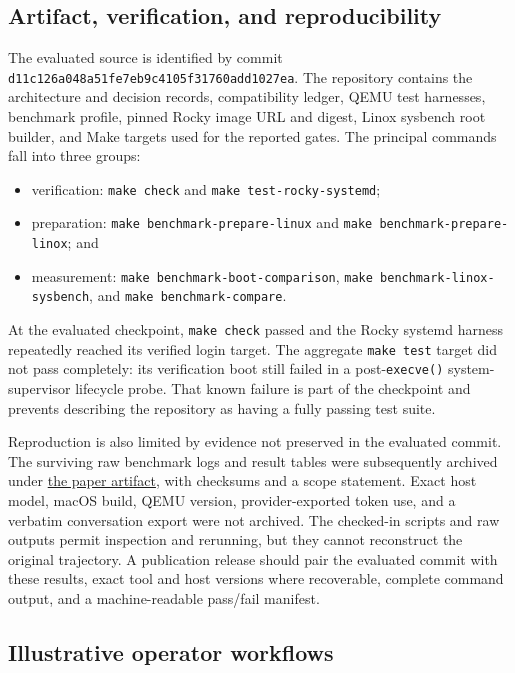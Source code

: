 \documentclass[11pt]{article}
\newcommand{\evaluatedcommit}{\texttt{d11c126a048a\allowbreak{}51fe7eb9c410\allowbreak{}5f31760add10\allowbreak{}27ea}}
\begin{document}
\subsection{Artifact, verification, and reproducibility}

The evaluated source is identified by commit \evaluatedcommit{}. The repository
contains the architecture and decision records, compatibility ledger, QEMU test
harnesses, benchmark profile, pinned Rocky image URL and digest, Linox sysbench
root builder, and Make targets used for the reported gates. The principal
commands fall into three groups:

\begin{itemize}[leftmargin=*,topsep=0.3em,itemsep=0.15em,parsep=0pt]
\item verification: \texttt{make check} and \texttt{make test-rocky-systemd};
\item preparation: \texttt{make benchmark-prepare-linux} and
  \texttt{make benchmark-prepare-linox}; and
\item measurement: \texttt{make benchmark-boot-comparison},
  \texttt{make benchmark-linox-sysbench}, and \texttt{make benchmark-compare}.
\end{itemize}

At the evaluated checkpoint, \texttt{make check} passed and the Rocky systemd
harness repeatedly reached its verified login target. The aggregate
\texttt{make test} target did not pass completely: its verification boot still
failed in a post-\texttt{execve()} system-supervisor lifecycle probe. That known
failure is part of the checkpoint and prevents describing the repository as
having a fully passing test suite.

Reproduction is also limited by evidence not preserved in the evaluated
commit. The surviving raw benchmark logs and result tables were subsequently
archived under
\href{https://github.com/gmkurtzer/ginux/tree/main/docs/paper/artifact/benchmark-2026-10-23}{the paper artifact},
with checksums and a scope statement. Exact host model, macOS build, QEMU
version, provider-exported token use, and a verbatim conversation export were
not archived. The checked-in scripts and raw outputs permit inspection and
rerunning, but they cannot reconstruct the original trajectory. A publication
release should pair the evaluated commit with these results, exact tool and
host versions where recoverable, complete command output, and a
machine-readable pass/fail manifest.

\subsection{Illustrative operator workflows}
\end{document}
